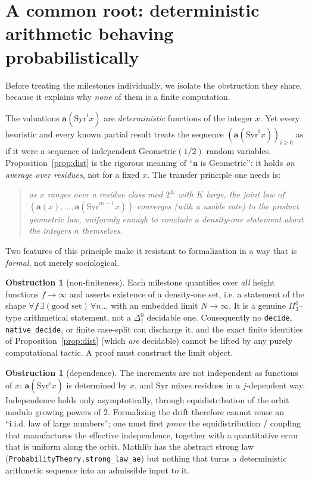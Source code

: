 \documentclass[11pt]{article}
\theoremstyle{plain}
\theoremstyle{definition}
\newtheorem{obstruction}[thm]{Obstruction}
\theoremstyle{remark}
\newcommand{\Syr}{\mathrm{Syr}}
\newcommand{\aval}{\mathbf{a}}
\newcommand{\code}[1]{\texttt{\small #1}}
\begin{document}
\section{A common root: deterministic arithmetic behaving probabilistically}
\label{sec:common}

Before treating the milestones individually, we isolate the obstruction they
share, because it explains why \emph{none} of them is a finite computation.

The valuations $\aval(\Syr^i x)$ are \emph{deterministic} functions of the
integer $x$. Yet every heuristic and every known partial result treats the
sequence $(\aval(\Syr^i x))_{i\ge0}$ as if it were a sequence of independent
$\mathrm{Geometric}(1/2)$ random variables. Proposition~\ref{prop:dist} is the
rigorous meaning of ``$\aval$ is $\mathrm{Geometric}$'': it holds \emph{on
average over residues}, not for a fixed $x$. The transfer principle one needs is:

\begin{quote}\itshape
as $x$ ranges over a residue class mod $2^K$ with $K$ large, the joint law of
$(\aval(x),\dots,\aval(\Syr^{m-1}x))$ converges (with a usable rate) to the
product geometric law, uniformly enough to conclude a density-one statement
about the integers $n$ themselves.
\end{quote}

Two features of this principle make it resistant to formalization in a way that
is \emph{formal}, not merely sociological.

\begin{obstruction}[non-finiteness]\label{obs:infinite}
Each milestone quantifies over \emph{all} height functions $f\to\infty$ and
asserts existence of a density-one set, i.e. a statement of the shape
$\forall f\, \exists (\text{good set})\, \forall n\dots$ with an embedded limit
$N\to\infty$. It is a genuine $\Pi^0_3$--type arithmetical statement, not a
$\Delta^0_1$ decidable one. Consequently no \code{decide}, \code{native\_decide},
or finite case-split can discharge it, and the exact finite identities of
Proposition~\ref{prop:dist} (which \emph{are} decidable) cannot be lifted by any
purely computational tactic. A proof must construct the limit object.
\end{obstruction}

\begin{obstruction}[dependence]\label{obs:dependence}
The increments are not independent as functions of $x$: $\aval(\Syr^i x)$ is
determined by $x$, and $\Syr$ mixes residues in a $j$-dependent way. Independence
holds only asymptotically, through equidistribution of the orbit modulo growing
powers of $2$. Formalizing the drift therefore cannot reuse an ``i.i.d. law of
large numbers''; one must first \emph{prove} the equidistribution / coupling that
manufactures the effective independence, together with a quantitative error that
is uniform along the orbit. Mathlib has the abstract strong law
(\code{ProbabilityTheory.strong\_law\_ae}) but nothing that turns a deterministic
arithmetic sequence into an admissible input to it.
\end{obstruction}
\end{document}
